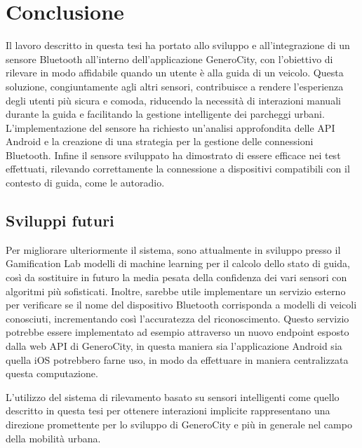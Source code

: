 \chapter{Conclusione}
Il lavoro descritto in questa tesi ha portato allo sviluppo e all'integrazione di un sensore Bluetooth all'interno dell'applicazione GeneroCity, con l'obiettivo di rilevare in modo affidabile quando un utente è alla guida di un veicolo. Questa soluzione, congiuntamente agli altri sensori, contribuisce a rendere l'esperienza degli utenti più sicura e comoda, riducendo la necessità di interazioni manuali durante la guida e facilitando la gestione intelligente dei parcheggi urbani. L'implementazione del sensore ha richiesto un'analisi approfondita delle API Android e la creazione di una strategia per la gestione delle connessioni Bluetooth. Infine il sensore sviluppato ha dimostrato di essere efficace nei test effettuati, rilevando correttamente la connessione a dispositivi compatibili con il contesto di guida, come le autoradio.


\section{Sviluppi futuri}
Per migliorare ulteriormente il sistema, sono attualmente in sviluppo presso il Gamification Lab modelli di machine learning per il calcolo dello stato di guida, così da sostituire in futuro la media pesata della confidenza dei vari sensori con algoritmi più sofisticati. Inoltre, sarebbe utile implementare un servizio esterno per verificare se il nome del dispositivo Bluetooth corrisponda a modelli di veicoli conosciuti, incrementando così l'accuratezza del riconoscimento. Questo servizio potrebbe essere implementato ad esempio attraverso un nuovo endpoint esposto dalla web API di GeneroCity, in questa maniera sia l'applicazione Android sia quella iOS potrebbero farne uso, in modo da effettuare in maniera centralizzata questa computazione.

L'utilizzo del sistema di rilevamento basato su sensori intelligenti come quello descritto in questa tesi per ottenere interazioni implicite rappresentano una direzione promettente per lo sviluppo di GeneroCity e più in generale nel campo della mobilità urbana.

